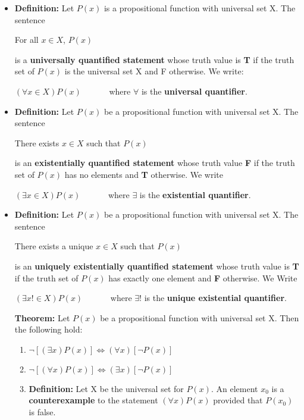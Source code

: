 \documentclass{report}
\begin{document}
		\begin{itemize}\addtolength{\leftskip}{2em}
			\item \textbf{Definition:} Let $P(x)$ is a propositional function with universal set X. The sentence
			\begin{center}
			For all $x\in X$, $P(x)$
			\end{center}
			is a \textbf{universally quantified statement} whose truth value is \textbf{T} if the truth set of $P(x)$ is the universal set X and F otherwise. We write:
			\begin{center}
			$(\forall x\in X)P(x)\quad\quad\quad$ where $\forall$ is the \textbf{universal quantifier}.
			\end{center}
			
			\item \textbf{Definition:} Let $P(x)$ be a propositional function with universal set X. The sentence 
			\begin{center}
			There exists $x\in X$ such that $P(x)$
			\end{center}
			is an \textbf{existentially quantified statement} whose truth value \textbf{F} if the truth set of $P(x)$ has no elements and \textbf{T} otherwise. We write
			\begin{center}
			$(\exists x\in X)P(x)\quad\quad\quad$ where $\exists$ is the \textbf{existential quantifier}.
			\end{center}
			
			\item \textbf{Definition:} Let $P(x)$ be a propositional function with universal set X. The sentence 
			\begin{center}
			There exists a unique $x\in X$ such that $P(x)$
			\end{center}
			is an \textbf{uniquely existentially quantified statement} whose truth value is \textbf{T} if the truth set of $P(x)$ has exactly one element and \textbf{F} otherwise. We Write
			\begin{center}
			$(\exists x!\in X)P(x)\quad\quad\quad$ where $\exists !$ is the \textbf{unique existential quantifier}.
			\end{center}
			\textbf{Theorem:} Let $P(x)$ be a propositional function with universal set X. Then the following hold:
			\begin{enumerate}\addtolength{\leftskip}{4em}
			\item $\neg[(\exists x)P(x)]\Longleftrightarrow (\forall x)[\neg P(x)]$
			\item $\neg[(\forall x)P(x)]\Longleftrightarrow (\exists x)[\neg P(x)]$
			\item \textbf{Definition:} Let X be the universal set for $P(x)$. An element $x_0$ is a \textbf{counterexample} to the statement $(\forall x)P(x)$ provided that $P(x_0)$ is false.
			\end{enumerate}
		\end{itemize}
	
\end{document}
